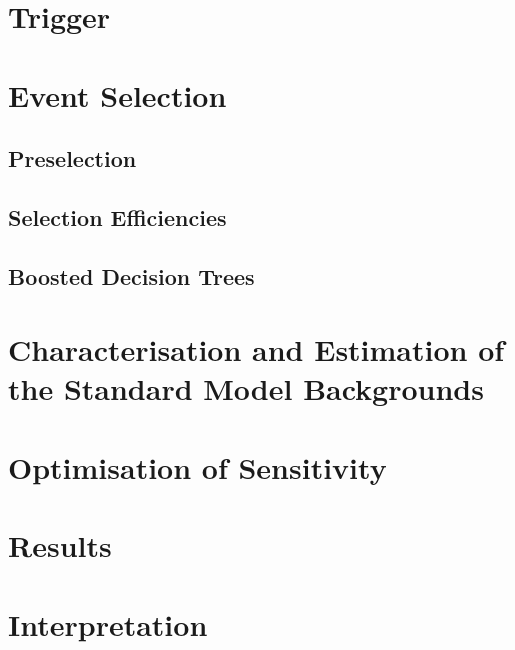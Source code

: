 \section{Trigger}
\label{sec:trigger}

\section{Event Selection}
\subsection{Preselection}
\subsection{Selection Efficiencies}
\subsection{Boosted Decision Trees}

\section{Characterisation and Estimation of the Standard Model Backgrounds}

\section{Optimisation of Sensitivity}

\section{Results}

\section{Interpretation}
